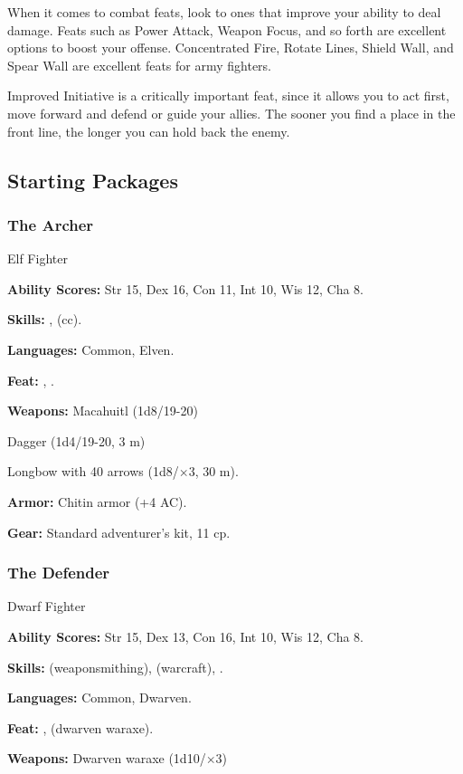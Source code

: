 When it comes to combat feats, look to ones that improve your ability to deal damage. Feats such as Power Attack, Weapon Focus, and so forth are excellent options to boost your offense. Concentrated Fire, Rotate Lines, Shield Wall, and Spear Wall are excellent feats for army fighters.

Improved Initiative is a critically important feat, since it allows you to act first, move forward and defend or guide your allies. The sooner you find a place in the front line, the longer you can hold back the enemy.

\subsection{Starting Packages}

\subsubsection{The Archer}
Elf Fighter

\textbf{Ability Scores:} Str 15, Dex 16, Con 11, Int 10, Wis 12, Cha 8.

\textbf{Skills:} ,  (cc).

\textbf{Languages:} Common, Elven.

\textbf{Feat:} , .

\textbf{Weapons:} Macahuitl (1d8/19-20)

Dagger (1d4/19-20, 3 m)

Longbow with 40 arrows (1d8/$\times$3, 30 m).

\textbf{Armor:} Chitin armor (+4 AC).

\textbf{Gear:} Standard adventurer's kit, 11 cp.

\subsubsection{The Defender}
Dwarf Fighter

\textbf{Ability Scores:} Str 15, Dex 13, Con 16, Int 10, Wis 12, Cha 8.

\textbf{Skills:}  (weaponsmithing),  (warcraft), .

\textbf{Languages:} Common, Dwarven.

\textbf{Feat:} ,  (dwarven waraxe).

\textbf{Weapons:} Dwarven waraxe (1d10/$\times$3)

